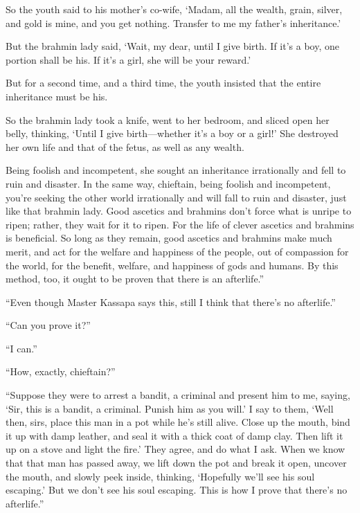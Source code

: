 \documentclass[12pt,openany]{book}%
\begin{document}
So the youth said to his mother’s co-wife, ‘Madam, all the wealth, grain, silver, and gold is mine, and you get nothing. Transfer to me my father’s inheritance.’ 

But the brahmin lady said, ‘Wait, my dear, until I give birth. If it’s a boy, one portion shall be his. If it’s a girl, she will be your reward.’ 

But for a second time, and a third time, the youth insisted that the entire inheritance must be his. 

So the brahmin lady took a knife, went to her bedroom, and sliced open her belly, thinking, ‘Until I give birth—whether it’s a boy or a girl!’ She destroyed her own life and that of the fetus, as well as any wealth. 

Being foolish and incompetent, she sought an inheritance irrationally and fell to ruin and disaster. In the same way, chieftain, being foolish and incompetent, you’re seeking the other world irrationally and will fall to ruin and disaster, just like that brahmin lady. Good ascetics and brahmins don’t force what is unripe to ripen; rather, they wait for it to ripen. For the life of clever ascetics and brahmins is beneficial. So long as they remain, good ascetics and brahmins make much merit, and act for the welfare and happiness of the people, out of compassion for the world, for the benefit, welfare, and happiness of gods and humans. By this method, too, it ought to be proven that there is an afterlife.” 

“Even though Master Kassapa says this, still I think that there’s no afterlife.” 

“Can you prove it?” 

“I can.” 

“How, exactly, chieftain?” 

“Suppose they were to arrest a bandit, a criminal and present him to me, saying, ‘Sir, this is a bandit, a criminal. Punish him as you will.’ I say to them, ‘Well then, sirs, place this man in a pot while he’s still alive. Close up the mouth, bind it up with damp leather, and seal it with a thick coat of damp clay. Then lift it up on a stove and light the fire.’ They agree, and do what I ask. When we know that that man has passed away, we lift down the pot and break it open, uncover the mouth, and slowly peek inside, thinking, ‘Hopefully we’ll see his soul escaping.’ But we don’t see his soul escaping. This is how I prove that there’s no afterlife.” 
\end{document}

